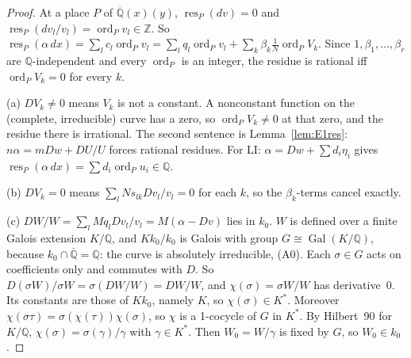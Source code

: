 \documentclass[11pt]{article}
\theoremstyle{definition}
\theoremstyle{remark}
\newcommand{\Q}{\mathbb{Q}}
\newcommand{\Z}{\mathbb{Z}}
\newcommand{\Qbar}{\overline{\mathbb{Q}}}
\begin{document}
\begin{proof}
At a place $P$ of $\Qbar(x)(y)$, $\operatorname{res}_P(dv)=0$ and
$\operatorname{res}_P(dv_l/v_l)=\operatorname{ord}_Pv_l\in\Z$. So
$\operatorname{res}_P(\alpha\,dx)=\sum_lc_l\operatorname{ord}_Pv_l
=\sum_lq_l\operatorname{ord}_Pv_l+\sum_k\beta_k\tfrac1N\operatorname{ord}_PV_k$. Since
$1,\beta_1,\dots,\beta_r$ are $\Q$-independent and every $\operatorname{ord}_P$ is an integer, the
residue is rational iff $\operatorname{ord}_PV_k=0$ for every $k$.

(a) $DV_k\ne0$ means $V_k$ is not a constant. A nonconstant function on the (complete,
irreducible) curve has a zero, so $\operatorname{ord}_PV_k\ne0$ at that zero, and the residue
there is irrational. The second sentence is Lemma~\ref{lem:E1res}: $n\alpha=mDw+DU/U$ forces
rational residues. For LI: $\alpha=Dw+\sum d_i\eta_i$ gives $\operatorname{res}_P(\alpha\,dx)=\sum
d_i\operatorname{ord}_Pu_i\in\Q$.

(b) $DV_k=0$ means $\sum_lNs_{lk}Dv_l/v_l=0$ for each $k$, so the $\beta_k$-terms cancel exactly.

(c) $DW/W=\sum_lMq_lDv_l/v_l=M(\alpha-Dv)$ lies in $k_0$. $W$ is defined over a finite Galois
extension $K/\Q$, and $Kk_0/k_0$ is Galois with group $G\cong\operatorname{Gal}(K/\Q)$, because
$k_0\cap\Qbar=\Q$: the curve is absolutely irreducible, (A0). Each $\sigma\in G$ acts on
coefficients only and commutes with $D$. So $D(\sigma W)/\sigma W=\sigma(DW/W)=DW/W$, and
$\chi(\sigma)=\sigma W/W$ has derivative~$0$. Its constants are those of $Kk_0$, namely $K$, so
$\chi(\sigma)\in K^*$. Moreover $\chi(\sigma\tau)=\sigma(\chi(\tau))\chi(\sigma)$, so $\chi$ is a
1-cocycle of $G$ in $K^*$. By Hilbert~90 for $K/\Q$, $\chi(\sigma)=\sigma(\gamma)/\gamma$ with
$\gamma\in K^*$. Then $W_0=W/\gamma$ is fixed by $G$, so $W_0\in k_0$.
\end{proof}
\end{document}
